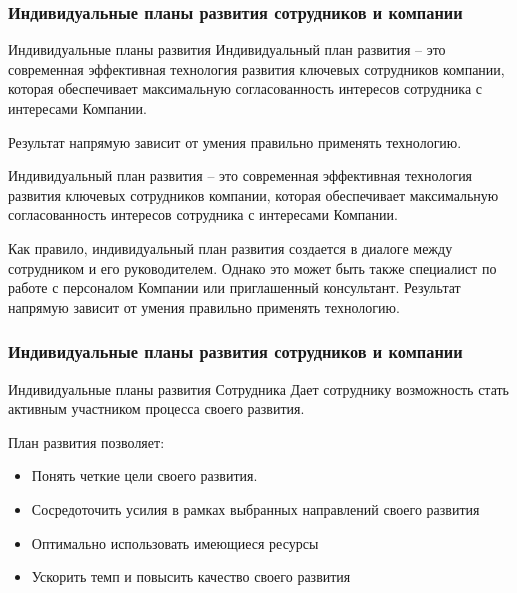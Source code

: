 \documentclass{../industrial-development}
\begin{document}

\begin{frame} \frametitle{Индивидуальные планы развития сотрудников и компании}
  \begin{block}{Индивидуальные планы развития}
 \alert{Индивидуальный план развития} – это современная эффективная технология развития ключевых сотрудников компании, которая обеспечивает максимальную согласованность интересов сотрудника с интересами Компании.
  \end{block}
  
  \begin{block}{}
Результат напрямую зависит от умения правильно применять технологию.
  \end{block}
\end{frame}

\lecturenotes
Индивидуальный план развития – это современная эффективная технология развития ключевых сотрудников компании, которая обеспечивает максимальную согласованность интересов сотрудника с интересами Компании.

Как правило, индивидуальный план развития создается в диалоге между сотрудником и его руководителем. Однако это может быть также специалист по работе с персоналом Компании или приглашенный консультант. Результат напрямую зависит от умения правильно применять технологию.


\begin{frame} \frametitle{Индивидуальные планы развития сотрудников и компании}
  \begin{block}{Индивидуальные планы развития Сотрудника}
Дает сотруднику возможность стать активным участником процесса своего развития.

План развития позволяет:
  \end{block}
  
   \begin{itemize}
  \item Понять четкие цели своего развития.
  \item Сосредоточить усилия в рамках выбранных направлений своего развития
  \item Оптимально использовать имеющиеся ресурсы
 \item Ускорить темп и повысить качество своего развития
  \end{itemize}
\end{frame}
\end{document}
